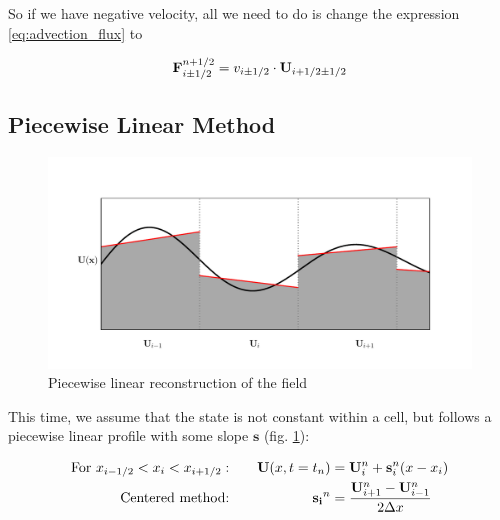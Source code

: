So if we have negative velocity, all we need to do is change the expression \ref{eq:advection_flux} to

\begin{equation}
	\mathbf{F}_{i\pm1/2}^{n+1/2} = v_{i\pm1/2}\cdot \mathbf{U}_{i + 1/2 \pm 1/2}
\end{equation}

















\subsection{Piecewise Linear Method}

\begin{figure}[htbp]
	\includegraphics[width=\textwidth]{./figures/piecewise_linear.pdf}%
	\caption{Piecewise linear reconstruction of the field
		\label{fig:pwlin}
	}
\end{figure}



This time, we assume that the state is not constant within a cell, but follows a piecewise linear profile with some slope $\mathbf{s}$ (fig. \ref{fig:pwlin}):

\begin{align*}
	\text{For } x_{i-1/2} < x_i < x_{i+1/2}: &&
	\quad \mathbf{U}(x, t=t_n) &= \mathbf{U}_i^n + \mathbf{s}_i^n(x - x_i) \\
	\text{Centered method:} && \mathbf{s_i}^n &= \frac{\mathbf{U}_{i+1}^n - \mathbf{U}_{i-1}^n}{ 2 \Delta x}
\end{align*}

